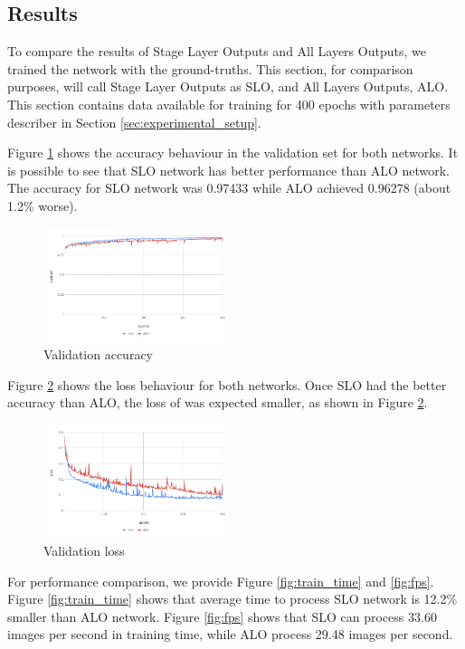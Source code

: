 \subsection{Results}

To compare the results of Stage Layer Outputs and All Layers Outputs, we trained the network with the ground-truths. This section, for comparison purposes, will call Stage Layer Outputs as SLO, and All Layers Outputs, ALO. This section contains data available for training for 400 epochs with parameters describer in Section \ref{sec:experimental_setup}.

Figure \ref{fig:val_accuracy} shows the accuracy behaviour in the validation set for both networks. It is possible to see that SLO network has better performance than ALO network. The accuracy for SLO network was  0.97433 while ALO achieved 0.96278 (about 1.2\% worse).

\begin{figure}
  \centering
  \includegraphics[width=0.48\textwidth]{figures/val_acc.png}
  \caption{Validation accuracy}
  \label{fig:val_accuracy}
\end{figure}

Figure \ref{fig:val_loss} shows the loss behaviour for both networks. Once SLO had the better accuracy than ALO, the loss of was expected smaller, as shown in Figure \ref{fig:val_loss}.

\begin{figure}
  \centering
  \includegraphics[width=0.48\textwidth]{figures/val_loss.png}
  \caption{Validation loss}
  \label{fig:val_loss}
\end{figure}

For performance comparison, we provide Figure \ref{fig:train_time} and \ref{fig:fps}. Figure \ref{fig:train_time} shows that average time to process SLO network is 12.2\% smaller than ALO network. Figure \ref{fig:fps} shows that SLO can process 33.60 images per second in training time, while ALO process 29.48 images per second.

